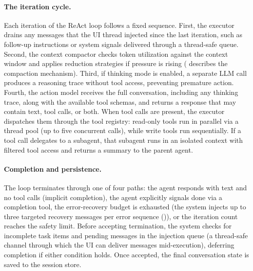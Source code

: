 \paragraph{The iteration cycle.} Each iteration of the ReAct loop follows a fixed sequence. First, the executor drains any messages that the UI thread injected since the last iteration, such as follow-up instructions or system signals delivered through a thread-safe queue. Second, the context compactor checks token utilization against the context window and applies reduction strategies if pressure is rising ( describes the compaction mechanism). Third, if thinking mode is enabled, a separate LLM call produces a reasoning trace without tool access, preventing premature action. Fourth, the action model receives the full conversation, including any thinking trace, along with the available tool schemas, and returns a response that may contain text, tool calls, or both. When tool calls are present, the executor dispatches them through the tool registry: read-only tools run in parallel via a thread pool (up to five concurrent calls), while write tools run sequentially. If a tool call delegates to a subagent, that subagent runs in an isolated context with filtered tool access and returns a summary to the parent agent.

\paragraph{Completion and persistence.} The loop terminates through one of four paths: the agent responds with text and no tool calls (implicit completion), the agent explicitly signals done via a completion tool, the error-recovery budget is exhausted (the system injects up to three targeted recovery messages per error sequence ()), or the iteration count reaches the safety limit. Before accepting termination, the system checks for incomplete task items and pending messages in the injection queue (a thread-safe channel through which the UI can deliver messages mid-execution), deferring completion if either condition holds. Once accepted, the final conversation state is saved to the session store.

